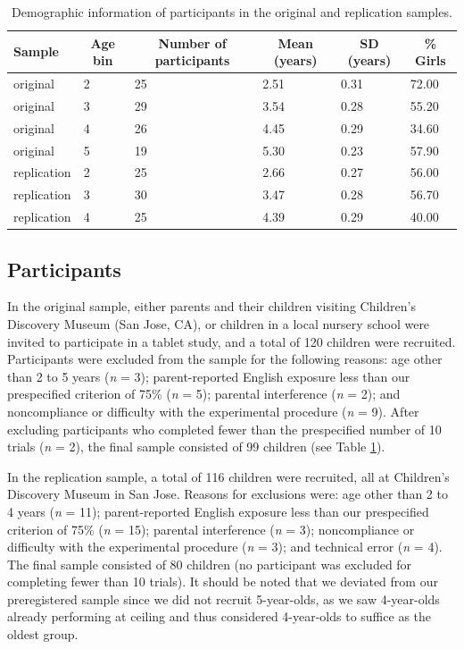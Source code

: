 \documentclass[man]{apa6}
\begin{document}
\begin{table}[tbp]
\begin{center}
\begin{threeparttable}
\caption{\label{tab:participantsummarytab}Demographic information of participants in the original and replication samples.}
\begin{tabular}{llllll}
\toprule
Sample & \multicolumn{1}{c}{Age bin} & \multicolumn{1}{c}{Number of participants} & \multicolumn{1}{c}{Mean (years)} & \multicolumn{1}{c}{SD (years)} & \multicolumn{1}{c}{\% Girls}\\
\midrule
original & 2 & 25 & 2.51 & 0.31 & 72.00\\
original & 3 & 29 & 3.54 & 0.28 & 55.20\\
original & 4 & 26 & 4.45 & 0.29 & 34.60\\
original & 5 & 19 & 5.30 & 0.23 & 57.90\\
replication & 2 & 25 & 2.66 & 0.27 & 56.00\\
replication & 3 & 30 & 3.47 & 0.28 & 56.70\\
replication & 4 & 25 & 4.39 & 0.29 & 40.00\\
\bottomrule
\end{tabular}
\end{threeparttable}
\end{center}
\end{table}

\subsection{Participants}\label{participants}

In the original sample, either parents and their children visiting
Children's Discovery Museum (San Jose, CA), or children in a local
nursery school were invited to participate in a tablet study, and a
total of 120 children were recruited. Participants were excluded from
the sample for the following reasons: age other than 2 to 5 years
(\emph{n} = 3); parent-reported English exposure less than our
prespecified criterion of 75\% (\emph{n} = 5); parental interference
(\emph{n} = 2); and noncompliance or difficulty with the experimental
procedure (\emph{n} = 9). After excluding participants who completed
fewer than the prespecified number of 10 trials (\emph{n} = 2), the
final sample consisted of 99 children (see Table
\ref{tab:participantsummarytab}).

In the replication sample, a total of 116 children were recruited, all
at Children's Discovery Museum in San Jose. Reasons for exclusions were:
age other than 2 to 4 years (\emph{n} = 11); parent-reported English
exposure less than our prespecified criterion of 75\% (\emph{n} = 15);
parental interference (\emph{n} = 3); noncompliance or difficulty with
the experimental procedure (\emph{n} = 3); and technical error (\emph{n}
= 4). The final sample consisted of 80 children (no participant was
excluded for completing fewer than 10 trials). It should be noted that
we deviated from our preregistered sample since we did not recruit
5-year-olds, as we saw 4-year-olds already performing at ceiling and
thus considered 4-year-olds to suffice as the oldest group.
\end{document}

